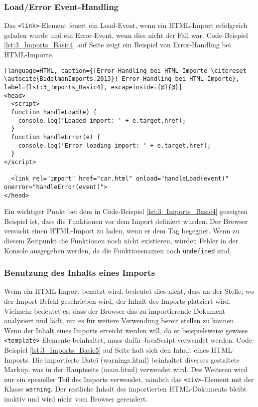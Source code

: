 \subsubsection{Load/Error Event-Handling}

Das \lstinline|<link>|-Element feuert ein \glqq Load\grqq -Event, wenn ein HTML-Import erfolgreich geladen wurde und ein \glqq Error\grqq -Event, wenn dies nicht der Fall war. Code-Beispiel \ref{lst:3_Imports_Basic4} auf Seite \pageref{lst:3_Imports_Basic4} zeigt ein Beispiel von Error-Handling bei HTML-Importe.

\begin{lstlisting}[language=HTML, caption={[Error-Handling bei HTML-Importe \citereset \autocite{BidelmanImports.2013}] Error-Handling bei HTML-Importe}, label={lst:3_Imports_Basic4}, escapeinside={@}{@}]
<head>
  <script>
  function handleLoad(e) {
    console.log('Loaded import: ' + e.target.href);
  }
  function handleError(e) {
    console.log('Error loading import: ' + e.target.href);
  }
</script>

  <link rel="import" href="car.html" onload="handleLoad(event)" onerror="handleError(event)">
</head>
\end{lstlisting}

Ein wichtiger Punkt bei dem in Code-Beispiel \ref{lst:3_Imports_Basic4} gezeigten Beispiel ist, dass die Funktionen vor dem Import definiert wurden. Der Browser versucht einen HTML-Import zu laden, wenn er dem Tag begegnet. Wenn zu diesem Zeitpunkt die Funktionen noch nicht existieren, würden Fehler in der Konsole ausgegeben werden, da die Funktionsnamen noch \lstinline|undefined| sind.

\subsubsection{Benutzung des Inhalts eines Imports}

Wenn ein HTML-Import benutzt wird, bedeutet dies nicht, dass an der Stelle, wo der Import-Befehl geschrieben wird, der Inhalt des Imports platziert wird. Vielmehr bedeutet es, dass der Browser das zu importierende Dokument analysiert und lädt, um es für weitere Verwendung bereit stellen zu können. Wenn der Inhalt eines Imports erreicht werden will, da er beispielsweise gewisse \lstinline|<template>|-Elemente beinhaltet, muss dafür JavaScript verwendet werden. Code-Beispiel \ref{lst:3_Imports_Basic5} auf Seite \pageref{lst:3_Imports_Basic5} holt sich den Inhalt eines HTML-Imports. Die importierte Datei (warnings.html) beinhaltet diverses gestaltete Markup, was in der Hauptseite (main.html) verwendet wird. Des Weiteren wird nur ein spezieller Teil des Imports verwendet, nämlich das \lstinline|<div>|-Element mit der Klasse \lstinline|warning|. Der restliche Inhalt des importierten HTML-Dokuments bleibt inaktiv und wird nicht vom Browser gerendert.

